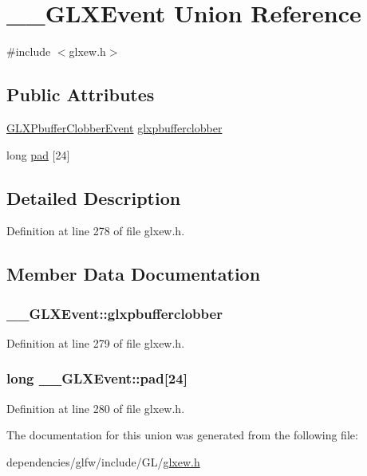 \hypertarget{union_____g_l_x_event}{\section{\-\_\-\-\_\-\-G\-L\-X\-Event Union Reference}
\label{union_____g_l_x_event}
}


{\ttfamily \#include $<$glxew.\-h$>$}

\subsection*{Public Attributes}
\begin{DoxyCompactItemize}
\item 
\hyperlink{struct_g_l_x_pbuffer_clobber_event}{G\-L\-X\-Pbuffer\-Clobber\-Event} \hyperlink{union_____g_l_x_event_ada5880e2b424bcb2f60a411aaf713fae}{glxpbufferclobber}
\item 
long \hyperlink{union_____g_l_x_event_a1cb8f6e7e77a34d25baf43b3f3bc2d4f}{pad} \mbox{[}24\mbox{]}
\end{DoxyCompactItemize}


\subsection{Detailed Description}


Definition at line 278 of file glxew.\-h.



\subsection{Member Data Documentation}
\hypertarget{union_____g_l_x_event_ada5880e2b424bcb2f60a411aaf713fae}{
\subsubsection[{glxpbufferclobber}]{ \-\_\-\-\_\-\-G\-L\-X\-Event\-::glxpbufferclobber}}\label{union_____g_l_x_event_ada5880e2b424bcb2f60a411aaf713fae}


Definition at line 279 of file glxew.\-h.

\hypertarget{union_____g_l_x_event_a1cb8f6e7e77a34d25baf43b3f3bc2d4f}{
\subsubsection[{pad}]{\setlength{\rightskip}{0pt plus 5cm}long \-\_\-\-\_\-\-G\-L\-X\-Event\-::pad\mbox{[}24\mbox{]}}}\label{union_____g_l_x_event_a1cb8f6e7e77a34d25baf43b3f3bc2d4f}


Definition at line 280 of file glxew.\-h.



The documentation for this union was generated from the following file\-:\begin{DoxyCompactItemize}
\item 
dependencies/glfw/include/\-G\-L/\hyperlink{glxew_8h}{glxew.\-h}\end{DoxyCompactItemize}
